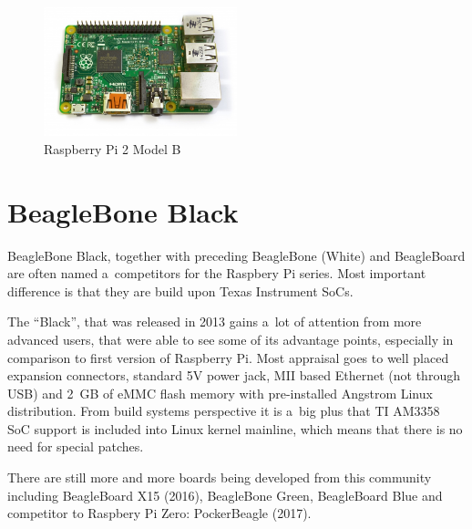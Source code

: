 \documentclass[printmode]{mgr}
\begin{document}
\begin{figure}[htbp]
  \centering
    \includegraphics[width=0.5\textwidth]{raspberrypi2-front.jpg}
  \caption{Raspberry Pi 2 Model B}
  \label{fig:devboard-raspberrypi2}
\end{figure}






\section{BeagleBone Black}

BeagleBone Black, together with preceding BeagleBone (White) and BeagleBoard are often named a~competitors for the Raspbery Pi series.
Most important difference is that they are build upon Texas Instrument SoCs.

The ``Black'', that was released in 2013 gains a~lot of attention from more advanced users, that were able to see some of its advantage points, especially in comparison to first version of Raspberry Pi.
Most appraisal goes to well placed expansion connectors, standard 5V power jack, MII based Ethernet (not through USB) and 2~GB of eMMC flash memory with pre-installed Angstrom Linux distribution.
From build systems perspective it is a~big plus that TI AM3358 SoC support is included into Linux kernel mainline, which means that there is no need for special patches.

There are still more and more boards being developed from this community including BeagleBoard X15 (2016), BeagleBone Green, BeagleBoard Blue and competitor to Raspbery Pi Zero: PockerBeagle (2017).
\end{document}
